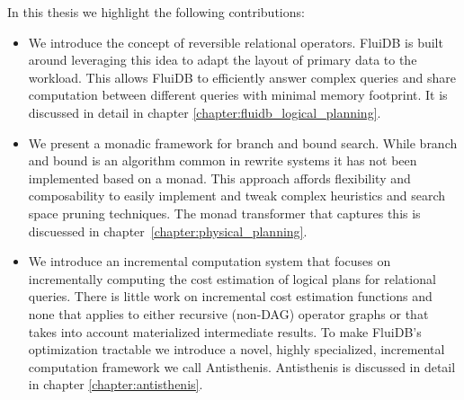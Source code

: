 In this thesis we highlight the following contributions:

\begin{itemize}
\item We introduce the concept of reversible relational
  operators. FluiDB is built around leveraging this idea to adapt the
  layout of primary data to the workload. This allows FluiDB to
  efficiently answer complex queries and share computation between
  different queries with minimal memory footprint. It is discussed in
  detail in chapter \ref{chapter:fluidb_logical_planning}.
\item We present a monadic framework for branch and bound
  search. While branch and bound is an algorithm common in rewrite
  systems it has not been implemented based on a monad. This approach
  affords flexibility and composability to easily implement and tweak
  complex heuristics and search space pruning techniques. The
   monad transformer that captures this is discuessed in
  chapter~\ref{chapter:physical_planning}.
\item We introduce an incremental computation system that focuses on
  incrementally computing the cost estimation of logical plans for
  relational queries. There is little work on incremental cost
  estimation functions and none that applies to either recursive
  (non-DAG) operator graphs or that takes into account materialized
  intermediate results. To make FluiDB's optimization tractable we
  introduce a novel, highly specialized, incremental computation
  framework we call Antisthenis. Antisthenis is discussed in detail in
  chapter \ref{chapter:antisthenis}.
\end{itemize}

  \begin{comment}
\begin{itemize}
\item We provide an overview of the literature regarding intermediate
  result recycling.
\item We describe a framework and a case study for a novel approach of
  unifying query planning and intermediate result management.
\item We introduce reversible relational operators and how they can be
  used to create effective plans in memory constrained environments,
  effectively unifying the query planning and intermediate result
  recycling mechanisms.
\item We introduce a novel variant of a branch and bound algorithm
  used for planning relational queries.
\item We introduce Antisthenis, a novel approach to incremental
  computation used for the needs of query planning that aggressively
  takes advantage of the particular properties of the computations
  involved in plan cost estimation and relation materialisability.
\item We describe a code generation framework to support the operation
  of FluiDB.
\item We provide experimental evaluation of how all these parts fit
  together to compose FluiDB, particularly in the context of a star
  schema based benchmark.
\end{itemize}
\end{comment}

